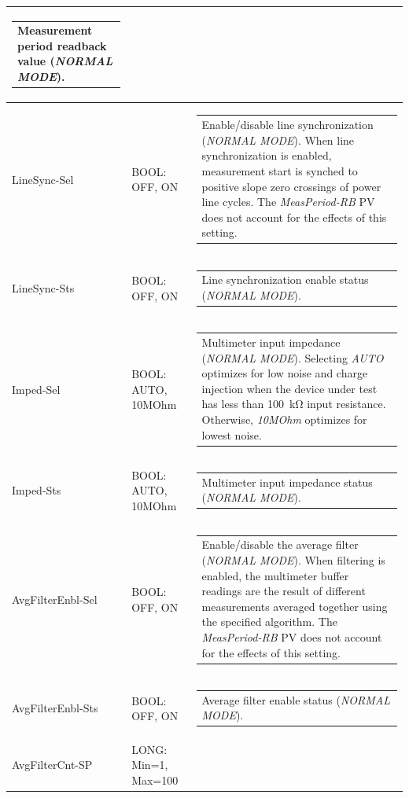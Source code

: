\documentclass[openany]{article}
\begin{document}
\begin{longtable}{| m{3.0cm} m{4.5cm} m{7.0cm} |}
\begin{tabular}{@{}m{6cm}@{}}
	    					Measurement period readback value (\emph{NORMAL MODE}).
						\end{tabular} \\ \hline
		LineSync-Sel & BOOL: OFF, ON & \begin{tabular}{@{}m{6cm}@{}}
	    					Enable/disable line synchronization (\emph{NORMAL MODE}). When line synchronization is enabled, measurement start is synched to positive slope zero crossings of power line cycles. The \emph{MeasPeriod-RB} PV does not account for the effects of this setting.
						\end{tabular} \\ \hline
		LineSync-Sts & BOOL: OFF, ON & \begin{tabular}{@{}m{6cm}@{}}
	    					Line synchronization enable status (\emph{NORMAL MODE}).
						\end{tabular} \\ \hline
		Imped-Sel & BOOL: AUTO, 10MOhm & \begin{tabular}{@{}m{6cm}@{}}
	    					Multimeter input impedance (\emph{NORMAL MODE}). Selecting \emph{AUTO} optimizes for low noise and charge injection when the device under test has less than \SI{100}{\kohm} input resistance. Otherwise, \emph{10MOhm} optimizes for lowest noise.
						\end{tabular} \\ \hline
		Imped-Sts & BOOL: AUTO, 10MOhm & \begin{tabular}{@{}m{6cm}@{}}
	    					Multimeter input impedance status (\emph{NORMAL MODE}).
						\end{tabular} \\ \hline
		AvgFilterEnbl-Sel & BOOL: OFF, ON & \begin{tabular}{@{}m{6cm}@{}}
	    					Enable/disable the average filter (\emph{NORMAL MODE}). When filtering is enabled, the multimeter buffer readings are the result of different measurements averaged together using the specified algorithm. The \emph{MeasPeriod-RB} PV does not account for the effects of this setting.
						\end{tabular} \\ \hline
		AvgFilterEnbl-Sts & BOOL: OFF, ON & \begin{tabular}{@{}m{6cm}@{}}
	    					Average filter enable status (\emph{NORMAL MODE}).
						\end{tabular} \\ \hline
		AvgFilterCnt-SP & LONG: Min=1, Max=100 & \begin{tabular}{@{}m{6cm}@{}}

\end{tabular}
\end{longtable}
\end{document}
